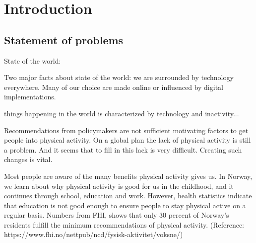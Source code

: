 \chapter{Introduction} 


\section{Statement of problems}
State of the world: 

Two major facts about state of the world: we are surrounded by technology everywhere. Many of our choice are made online or influenced by digital implementations. 

things happening in the world is characterized by technology and inactivity... 



Recommendations from policymakers are not sufficient motivating factors to get people into physical activity. On a global plan the lack of physical activity is still a problem. And it seems that to fill in this lack is very difficult. Creating such changes is vital. 

Most people are aware of the many benefits physical activity gives us. In Norway, we learn about why physical activity is good for us in the childhood, and it continues through school, education and work. However, health statistics indicate that education is not good enough to ensure people to stay physical active on a regular basis. Numbers from FHI, shows that only 30 percent of Norway's residents fulfill the minimum recommendations of physical activity. (Reference: https://www.fhi.no/nettpub/ncd/fysisk-aktivitet/voksne/) 

